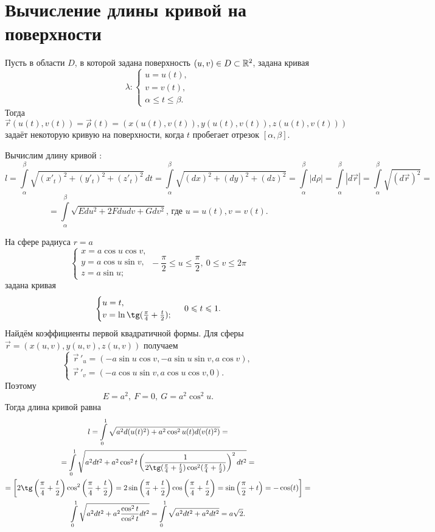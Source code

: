 \documentclass[../../main.tex]{subfiles}
\begin{document}
\section{Вычисление длины кривой на поверхности}

Пусть в области $D$, в которой задана поверхность 
$(u, v) \in D \subset \mathbb{R}^2$, задана кривая 
\[\lambda : \begin{cases}
             u = u(t),\\
             v = v(t),\\
             \alpha \leq t \leq \beta.
            \end{cases}\]
Тогда $\vec{r}(u(t), v(t)) = \vec{\rho}(t) = (x(u(t), v(t)), y(u(t), 
v(t)), z(u(t), v(t)))$ задаёт некоторую кривую на поверхности, когда $t$ 
пробегает отрезок $\left[\alpha, \beta\right]$.

Вычислим длину кривой : 
\[
l = \int\limits_\alpha^\beta\sqrt{(x'_t)^2 + (y'_t)^2 + (z'_t)^2}\,dt = 
\int\limits_\alpha^\beta\sqrt{(dx)^2 + (dy)^2 + (dz)^2} = 
\int\limits_\alpha^\beta  |d\rho| =  \int\limits_\alpha^\beta|d\vec{r}| = 
\int\limits_\alpha^\beta\sqrt{(d\vec{r})^2} = \] 
\[ 
= \int\limits_\alpha^\beta\sqrt{Edu^2 + 2Fdudv + Gdv^2} \text{, где } u = 
u(t), v = v(t). 
\]

\begin{exmp}
На сфере радиуса $r = a$
\[\begin{cases}
 x = a\cos u\cos v,\\
 y = a\cos u\sin v,\\
 z = a\sin u;
 \end{cases}
 -\frac{\pi}{2} \leq u \leq \frac{\pi}{2},\ 
 0\leq v \leq 2\pi\]
задана кривая
\[\begin{cases}
u = t,\\
v = \ln\tg(\frac{\pi}{4} + \frac{t}{2});
\end{cases} \ 0 \leq t \leq 1.\]
Найдём коэффициенты первой квадратичной формы. Для 
сферы $\vec{r} = (x(u, v), y(u, v), z(u, v))$ получаем
\[
\begin{cases}
\vec r\,'_u = (-a\sin u\cos v, -a\sin u\sin v, a\cos v),\\
\vec r\,'_v = (-a\cos u\sin v, a\cos u\cos v, 0).
\end{cases}
\]
Поэтому
\[
E = a^2, \ F = 0, \ G = a^2\cos^2u.
\]
Тогда длина кривой равна
\begin{gather*}
l = \int\limits_0^1\sqrt{a^2d(u(t)^2) + 
a^2\cos^2u(t)d(v(t)^2)} =
\\ =
\int\limits_0^1\sqrt{a^2dt^2 + a^2\cos^2t\left(\frac{1}{2\tg(\frac{\pi}{4} + 
\frac{t}{2})\cos^2(\frac{\pi}{4} + \frac{t}{2})}\right)^2dt^2} = \\
= \left[ 2\tg\left(\frac{\pi}{4} + 
\frac{t}{2}\right)\cos^2\left(\frac{\pi}{4} + \frac{t}{2}\right) = 
2\sin\left(\frac{\pi}{4} + 
\frac{t}{2}\right)\cos\left(\frac{\pi}{4} + \frac{t}{2}\right) = 
\sin\left(\frac\pi2 + t\right) = -\cos(t)
\right] =\\
\int\limits_0^1\sqrt{a^2dt^2 + a^2\frac{\cos^2t}{\cos^2t}dt^2} = 
\int\limits_0^1\sqrt{a^2dt^2 + a^2dt^2} = a\sqrt2.
\end{gather*}
\end{exmp}
\end{document}
